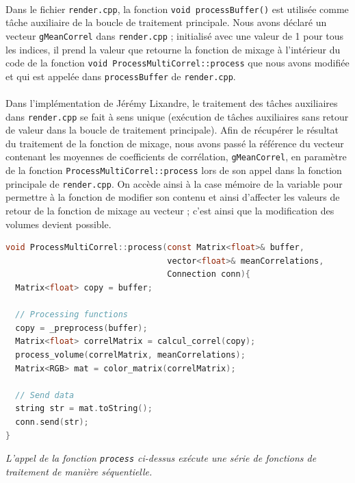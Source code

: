  \paragraph{}
 Dans le fichier \verb!render.cpp!, la fonction
 \verb!void processBuffer()! est utilisée comme tâche auxiliaire de la
 boucle de traitement principale. Nous avons déclaré un vecteur
 \verb!gMeanCorrel! dans \verb!render.cpp! ; initialisé avec une valeur
 de 1 pour tous les indices, il prend la valeur que retourne la
 fonction de mixage à l'intérieur du code de la fonction
 \verb!void ProcessMultiCorrel::process!
 que nous avons modifiée et qui est appelée dans \verb!processBuffer!
 de \verb!render.cpp!.
 \paragraph{}
 Dans l'implémentation de Jérémy Lixandre, le traitement des tâches
 auxiliaires dans \verb!render.cpp! se fait à sens unique
 (exécution de tâches auxiliaires sans retour de valeur dans la boucle
 de traitement principale). Afin de récupérer le résultat du
 traitement de la fonction de mixage, nous avons passé la référence du
 vecteur contenant les moyennes de coefficients de corrélation,
 \verb!gMeanCorrel!, en paramètre de la fonction
 \verb!ProcessMultiCorrel::process! lors de son appel dans la fonction
 principale de \verb!render.cpp!. On accède ainsi à la case mémoire de
 la variable pour permettre à la fonction de modifier son contenu et
 ainsi d'affecter les valeurs de retour de la fonction de mixage au
 vecteur ; c'est ainsi que la modification des volumes devient
 possible.

 \begin{lstlisting}[language=C, frame=single, breaklines=true]
void ProcessMultiCorrel::process(const Matrix<float>& buffer,
                                 vector<float>& meanCorrelations,
                                 Connection conn){
  Matrix<float> copy = buffer;

  // Processing functions
  copy = _preprocess(buffer);
  Matrix<float> correlMatrix = calcul_correl(copy);
  process_volume(correlMatrix, meanCorrelations);
  Matrix<RGB> mat = color_matrix(correlMatrix);

  // Send data
  string str = mat.toString();
  conn.send(str);
}
 \end{lstlisting}
 \begin{center}
  \textit{L'appel de la fonction \verb!process! ci-dessus exécute une série de fonctions de traitement de manière séquentielle.}
 \end{center}

